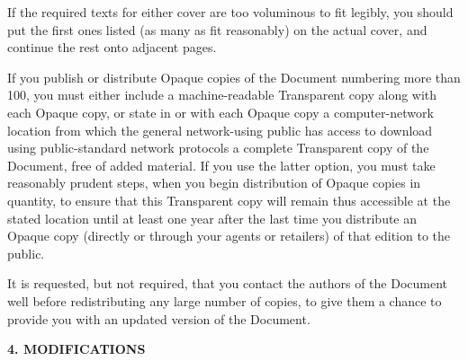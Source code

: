 \documentclass[a4paper,12pt,english]{sphinxmanual}
\begin{document}
If the required texts for either cover are too voluminous to fit
legibly, you should put the first ones listed (as many as fit
reasonably) on the actual cover, and continue the rest onto adjacent
pages.

If you publish or distribute Opaque copies of the Document numbering
more than 100, you must either include a machine-readable Transparent
copy along with each Opaque copy, or state in or with each Opaque copy a
computer-network location from which the general network-using public
has access to download using public-standard network protocols a
complete Transparent copy of the Document, free of added material. If
you use the latter option, you must take reasonably prudent steps, when
you begin distribution of Opaque copies in quantity, to ensure that this
Transparent copy will remain thus accessible at the stated location
until at least one year after the last time you distribute an Opaque
copy (directly or through your agents or retailers) of that edition to
the public.

It is requested, but not required, that you contact the authors of the
Document well before redistributing any large number of copies, to give
them a chance to provide you with an updated version of the Document.

\textbf{4. MODIFICATIONS}
\end{document}
